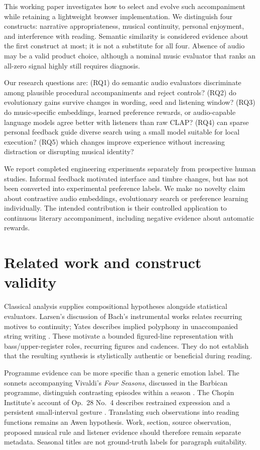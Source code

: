 \documentclass[11pt]{article}
\begin{document}
This working paper investigates how to select and evolve such accompaniment while retaining a lightweight browser implementation. We distinguish four constructs: narrative appropriateness, musical continuity, personal enjoyment, and interference with reading. Semantic similarity is considered evidence about the first construct at most; it is not a substitute for all four. Absence of audio may be a valid product choice, although a nominal music evaluator that ranks an all-zero signal highly still requires diagnosis.

Our research questions are: (RQ1) do semantic audio evaluators discriminate among plausible procedural accompaniments and reject controls? (RQ2) do evolutionary gains survive changes in wording, seed and listening window? (RQ3) do music-specific embeddings, learned preference rewards, or audio-capable language models agree better with listeners than raw CLAP? (RQ4) can sparse personal feedback guide diverse search using a small model suitable for local execution? (RQ5) which changes improve experience without increasing distraction or disrupting musical identity?

We report completed engineering experiments separately from prospective human studies. Informal feedback motivated interface and timbre changes, but has not been converted into experimental preference labels. We make no novelty claim about contrastive audio embeddings, evolutionary search or preference learning individually. The intended contribution is their controlled application to continuous literary accompaniment, including negative evidence about automatic rewards.

\section{Related work and construct validity}
Classical analysis supplies compositional hypotheses alongside statistical evaluators. Larsen's discussion of Bach's instrumental works relates recurring motives to continuity; Yates describes implied polyphony in unaccompanied string writing \cite{larsen,yates}. These motivate a bounded figured-line representation with bass/upper-register roles, recurring figures and cadences. They do not establish that the resulting synthesis is stylistically authentic or beneficial during reading.

Programme evidence can be more specific than a generic emotion label. The sonnets accompanying Vivaldi's \emph{Four Seasons}, discussed in the Barbican programme, distinguish contrasting episodes within a season \cite{vivaldi}. The Chopin Institute's account of Op.~28 No.~4 describes restrained expression and a persistent small-interval gesture \cite{chopin}. Translating such observations into reading functions remains an Awen hypothesis. Work, section, source observation, proposed musical rule and listener evidence should therefore remain separate metadata. Seasonal titles are not ground-truth labels for paragraph suitability.
\end{document}
